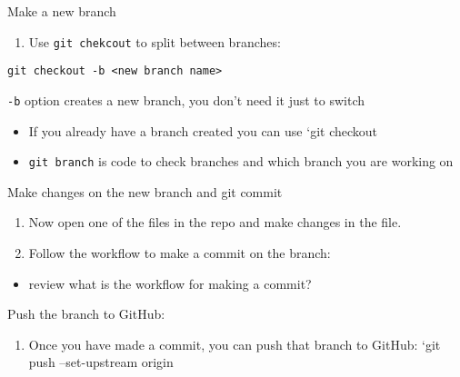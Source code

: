 \documentclass[ignorenonframetext,]{beamer}
\providecommand{\tightlist}{%
  \setlength{\itemsep}{0pt}\setlength{\parskip}{0pt}}
\begin{document}
\begin{frame}[fragile]{Make a new branch}

\begin{enumerate}
\def\labelenumi{\arabic{enumi}.}
\tightlist
\item
  Use \texttt{git\ chekcout} to split between branches:
\end{enumerate}

\texttt{git\ checkout\ -b\ \textless{}new\ branch\ name\textgreater{}}

\texttt{-b} option creates a new branch, you don't need it just to
switch

\begin{itemize}
\item
  If you already have a branch created you can use `git checkout 
\item
  \texttt{git\ branch} is code to check branches and which branch you
  are working on
\end{itemize}

\end{frame}

\begin{frame}{Make changes on the new branch and git commit}

\begin{enumerate}
\def\labelenumi{\arabic{enumi}.}
\setcounter{enumi}{1}
\item
  Now open one of the files in the repo and make changes in the file.
\item
  Follow the workflow to make a commit on the branch:
\end{enumerate}

\begin{itemize}
\tightlist
\item
  review what is the workflow for making a commit?
\end{itemize}

\end{frame}

\begin{frame}{Push the branch to GitHub:}

\begin{enumerate}
\def\labelenumi{\arabic{enumi}.}
\setcounter{enumi}{3}
\tightlist
\item
  Once you have made a commit, you can push that branch to GitHub: `git
  push --set-upstream origin 
\end{enumerate}

\end{frame}
\end{document}
